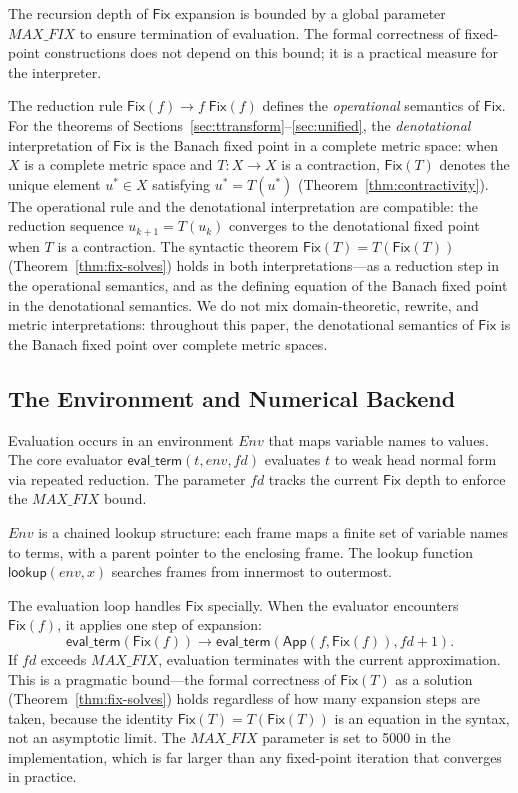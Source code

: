 \documentclass{lmcs}
\theoremstyle{plain}
\theoremstyle{definition}
\newcommand{\app}[2]{#1\;#2}
\newcommand{\fix}{\mathsf{Fix}}
\begin{document}
The recursion depth of $\fix$ expansion is bounded by a global parameter
$\mathit{MAX\_FIX}$ to ensure termination of evaluation. The formal
correctness of fixed-point constructions does not depend on this bound;
it is a practical measure for the interpreter.

\begin{rem}[Semantic interpretation of $\fix$]\label{rem:fix-semantics}
The reduction rule $\fix(f) \to \app{f}{\fix(f)}$ defines the
\emph{operational} semantics of $\fix$. For the theorems of
Sections~\ref{sec:ttransform}--\ref{sec:unified}, the \emph{denotational}
interpretation of $\fix$ is the Banach fixed point in a complete metric space:
when $X$ is a complete metric space and $T : X \to X$ is a contraction, $\fix(T)$
denotes the unique element $u^* \in X$ satisfying $u^* = T(u^*)$
(Theorem~\ref{thm:contractivity}). The operational rule and the denotational
interpretation are compatible: the reduction sequence $u_{k+1} = T(u_k)$
converges to the denotational fixed point when $T$ is a contraction. The
syntactic theorem $\fix(T) = T(\fix(T))$ (Theorem~\ref{thm:fix-solves}) holds
in both interpretations---as a reduction step in the operational semantics, and
as the defining equation of the Banach fixed point in the denotational
semantics. We do not mix domain-theoretic, rewrite, and metric interpretations:
throughout this paper, the denotational semantics of $\fix$ is the
Banach fixed point over complete metric spaces.
\end{rem}

\subsection{The Environment and Numerical Backend}

Evaluation occurs in an environment $\mathit{Env}$ that maps variable names
to values. The core evaluator $\mathsf{eval\_term}(t, \mathit{env}, fd)$
evaluates $t$ to weak head normal form via repeated reduction. The
parameter $fd$ tracks the current $\fix$ depth to enforce the
$\mathit{MAX\_FIX}$ bound.

\begin{defi}[Environment]
$\mathit{Env}$ is a chained lookup structure: each frame maps a finite set of
variable names to terms, with a parent pointer to the enclosing frame. The
lookup function $\mathsf{lookup}(\mathit{env}, x)$ searches frames from
innermost to outermost.
\end{defi}

The evaluation loop handles $\fix$ specially. When the evaluator encounters
$\fix(f)$, it applies one step of expansion:
\[
\mathsf{eval\_term}(\fix(f)) \to \mathsf{eval\_term}(\mathsf{App}(f, \fix(f)), fd+1).
\]
If $fd$ exceeds $\mathit{MAX\_FIX}$, evaluation terminates with the current
approximation. This is a pragmatic bound---the formal correctness of
$\fix(T)$ as a solution (Theorem~\ref{thm:fix-solves}) holds regardless of
how many expansion steps are taken, because the identity
$\fix(T) = T(\fix(T))$ is an equation in the syntax, not an asymptotic
limit. The $\mathit{MAX\_FIX}$ parameter is set to 5000 in the implementation,
which is far larger than any fixed-point iteration that converges in
practice.
\end{document}
